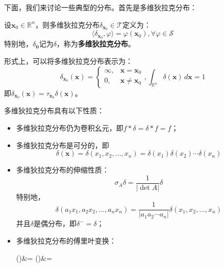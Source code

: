 \documentclass{ctexbook}
\begin{document}
下面，我们来讨论一些典型的分布。首先是多维狄拉克分布：
\begin{definition}[多维狄拉克分布]
    设$\mathbf{x}_0\in\mathbb{R}^n$，则多维狄拉克分布$\delta_{\mathbf{x}_0}\in\mathcal{T} $定义为：
    \[\langle \delta_{\mathbf{x}_0},\varphi\rangle=\varphi(\mathbf{x}_0),\forall \varphi\in\mathcal{S} \]
    特别地，$\delta_{\mathbf{0}}$记为$\delta$，称为\textbf{多维狄拉克分布}。

    形式上，可以将多维狄拉克分布表示为：
    \[\delta_{\mathbf{x}_0}(\mathbf{x})=\begin{cases}
    \infty,&\mathbf{x}=\mathbf{x}_0\\
    0,&\mathbf{x}\neq \mathbf{x}_0
    \end{cases},\int_{\mathbb{R}^n}\delta(\mathbf{x})\,d\mathbf{x}=1\]
    即$\delta_{\mathbf{x}_0}(\mathbf{x})=\tau_{\mathbf{x}_0}\delta(\mathbf{x})$。
\end{definition}
\begin{proposition}[多维狄拉克分布的性质]
    多维狄拉克分布具有以下性质：
    \begin{itemize}
        \item 多维狄拉克分布仍为卷积幺元，即$f*\delta=\delta*f=f$；
        \item 多维狄拉克分布是可分的，即
        \[\delta(\mathbf{x})=\delta(x_1,x_2,\ldots,x_n)=\delta(x_1)\delta(x_2)\cdots \delta(x_n)\]
        \item 多维狄拉克分布的伸缩性质：
        \[\sigma_A \delta=\frac{1}{|\det A|}\delta\]
        特别地，\[\delta(a_1 x_1,a_2 x_2,\ldots,a_n x_n)=\frac{1}{|a_1 a_2 \cdots a_n|}\delta(x_1,x_2,\ldots,x_n)\]
        并且$\delta$是偶分布，即$\delta^-=\delta$；
        \item 多维狄拉克分布的傅里叶变换：
        \begin{lralign}
         \delta(\boldsymbol{\xi})&=
\switch
         \delta(\boldsymbol{\omega})&=
        \end{lralign}
    \end{itemize}
\end{proposition}
\end{document}
